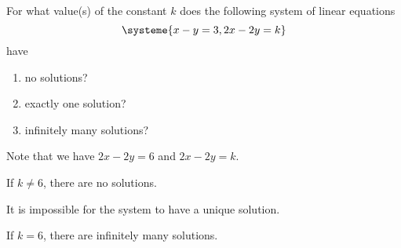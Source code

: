 \begin{problem}
    For what value(s) of the constant $k$ does the following system of linear equations \[\systeme{x - y = 3, 2x-2y =k}\] have
    \begin{enumerate}
        \item no solutions?
        \item exactly one solution?
        \item infinitely many solutions?
    \end{enumerate}
\end{problem}
\begin{solution}
    Note that we have $2x - 2y = 6$ and $2x - 2y = k$. 
    \begin{ppart}
        If $k \neq 6$, there are no solutions.
    \end{ppart}
    \begin{ppart}
        It is impossible for the system to have a unique solution.
    \end{ppart}
    \begin{ppart}
        If $k = 6$, there are infinitely many solutions.
    \end{ppart}
\end{solution}

